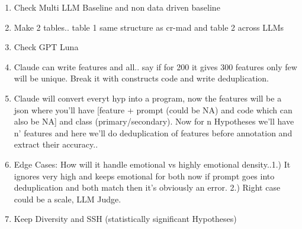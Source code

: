 \begin{enumerate}
\item Check Multi LLM Baseline and non data driven baseline
\item Make 2 tables.. table 1 same structure as cr-mad and table 2 across LLMs
\item Check GPT Luna 
\item Claude can write features and all.. say if for 200 it gives 300 features only few will be unique. Break it with constructs code and write deduplication. \item Claude will convert everyt hyp into a program, now the features will be a json where you'll have [feature + prompt (could be NA) and code which can also be NA] and class (primary/secondary). Now for n Hypotheses we'll have n' features and here we'll do deduplication of features before annotation and extract their accuracy..
\item Edge Cases: How will it handle emotional vs highly emotional density..1.) It ignores very high and keeps emotional for both now if prompt goes into deduplication and both match then it's obviously an error. 2.) Right case could be a scale, LLM Judge.
\item Keep Diversity and SSH (statistically significant Hypotheses)\textbf{}

\end{enumerate}
